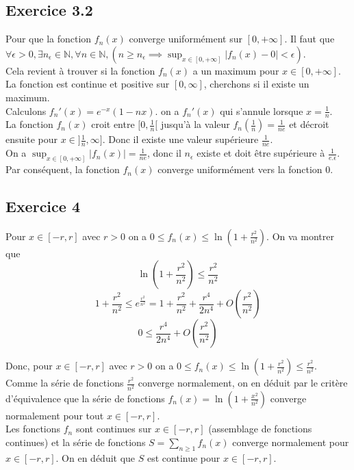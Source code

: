 \documentclass[]{book}
\theoremstyle{definition}
\newcommand{\bb}[1]{\mathbb{#1}}
\newcommand{\N}{\bb{N}}
\begin{document}
\subsection*{Exercice 3.2}
Pour que la fonction $f_n(x)$ converge uniform\'ement sur $[0,+\infty]$. Il faut que $\forall \epsilon > 0, \exists n_{\epsilon} \in \N, \forall n \in \N, (n \geq n_{\epsilon} \implies \sup_{x \in [0,+\infty]} |f_n(x)-0| < \epsilon)$. \\

Cela revient \`a trouver si la fonction $f_n(x)$ a un maximum pour $x \in [0,+\infty]$.\\
La fonction est continue et positive sur $[0,\infty]$, cherchons si il existe un maximum.\\

Calculons $f_{n}'(x) = e^{-x}(1-nx)$. on a $f_{n}'(x)$ qui s'annule lorsque $x = \frac{1}{n}$.\\

La fonction $f_{n}(x)$ croit entre $[0,\frac{1}{n}[$ jusqu'\`a la valeur $f_n(\frac{1}{n}) = \frac{1}{ne}$ et d\'ecroit ensuite pour $x \in ]\frac{1}{n}, \infty]$. Donc il existe une valeur sup\'erieure $\frac{1}{ne}$. \\

On a $\sup_{x \in [0,+\infty]}|f_n(x)| = \frac{1}{ne}$, donc il $n_{\epsilon}$  existe et doit \^etre sup\'erieure \`a $\frac{1}{e.\epsilon}$. Par cons\'equent, la fonction $f_n(x)$ converge uniform\'ement vers la fonction $0$. 



\subsection*{Exercice 4}
Pour $x \in [-r,r]$ avec $r > 0$ on a $0 \leq f_n(x) \leq \ln\left(1+\frac{r^2}{n^2}\right)$. On va montrer que 
$$\ln\left(1+\frac{r^2}{n^2}\right) \leq \frac{r^2}{n^2}$$
$$1+\frac{r^2}{n^2} \leq e^{\frac{r^2}{n^2}} = 1 + \frac{r^2}{n^2} + \frac{r^4}{2n^4} + O(\frac{r^2}{n^2})$$
$$0 \leq \frac{r^4}{2n^4} + O(\frac{r^2}{n^2})$$

Donc, pour $x \in [-r,r]$ avec $r > 0$ on a $0 \leq f_n(x) \leq \ln\left(1+\frac{r^2}{n^2}\right) \leq \frac{r^2}{n^2}$. Comme la s\'erie de fonctions $\frac{r^2}{n^2}$ converge normalement, on en d\'eduit par le crit\`ere d'\'equivalence que la s\'erie de fonctions $f_n(x) = \ln(1+\frac{x^2}{n^2})$ converge normalement pour tout $x \in [-r, r]$.\\

Les fonctions $f_n$ sont continues sur $x \in [-r,r]$ (assemblage de fonctions continues) et la s\'erie de fonctions $S = \sum_{n \geq 1}{f_n(x)}$ converge normalement pour $x \in [-r,r]$. On en d\'eduit que $S$ est continue pour $x \in [-r,r]$. 
\end{document}
